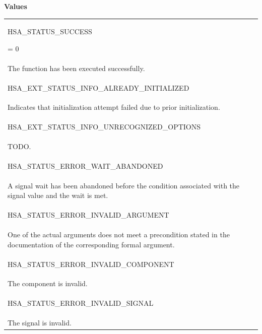 \documentclass[final]{book}
\newcommand{\reftyp}[1]{#1}
\newcommand{\refenu}[1]{\reftyp{#1}}
\begin{document}
\noindent\textbf{Values}\\[-5mm]
\begin{longtable}{@{\hspace{2em}}p{\linewidth-2em}}
\hspace{-2em}\hypertarget{group__status_1ggad755322e7ff95456520e8abdbe90d225ae382ea0c9c05cce5a60d0317375159cc}{\refenu{HSA_\-STATUS_\-SUCCESS}} = 0\\The function has been executed successfully.\\[2mm]
\hspace{-2em}\hypertarget{group__status_1ggad755322e7ff95456520e8abdbe90d225a0882e3ebb9cc8a5c6033c43ee7a6d898}{\refenu{HSA_\-EXT_\-STATUS_\-INFO_\-ALREADY_\-INITIALIZED}} \\Indicates that initialization attempt failed due to prior initialization.\\[2mm]
\hspace{-2em}\hypertarget{group__status_1ggad755322e7ff95456520e8abdbe90d225a60343279bea68766b037297915b5f903}{\refenu{HSA_\-EXT_\-STATUS_\-INFO_\-UNRECOGNIZED_\-OPTIONS}} \\TODO.\\[2mm]
\hspace{-2em}\hypertarget{group__status_1ggad755322e7ff95456520e8abdbe90d225a3081a89b2b191a77f426b5697bca7360}{\refenu{HSA_\-STATUS_\-ERROR_\-WAIT_\-ABANDONED}} \\A signal wait has been abandoned before the condition associated with the signal value and the wait is met.\\[2mm]
\hspace{-2em}\hypertarget{group__status_1ggad755322e7ff95456520e8abdbe90d225ac7d3651f75107d2a6a8ba3b25683c030}{\refenu{HSA_\-STATUS_\-ERROR_\-INVALID_\-ARGUMENT}} \\One of the actual arguments does not meet a precondition stated in the documentation of the corresponding formal argument.\\[2mm]
\hspace{-2em}\hypertarget{group__status_1ggad755322e7ff95456520e8abdbe90d225ac136a6651d66e234971df5083600bbd0}{\refenu{HSA_\-STATUS_\-ERROR_\-INVALID_\-COMPONENT}} \\The component is invalid.\\[2mm]
\hspace{-2em}\hypertarget{group__status_1ggad755322e7ff95456520e8abdbe90d225a7b4c8c0d4c99a1fe966abc2d39b575fe}{\refenu{HSA_\-STATUS_\-ERROR_\-INVALID_\-SIGNAL}} \\The signal is invalid.\\[2mm]

\end{longtable}
\end{document}
